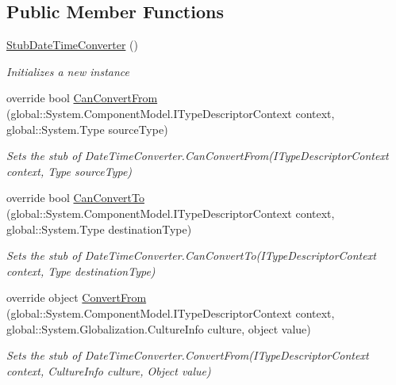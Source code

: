 \subsection*{Public Member Functions}
\begin{DoxyCompactItemize}
\item 
\hyperlink{class_system_1_1_component_model_1_1_fakes_1_1_stub_date_time_converter_abc1ce707daa1f4f85f416f66270790b8}{Stub\-Date\-Time\-Converter} ()
\begin{DoxyCompactList}\small\item\em Initializes a new instance\end{DoxyCompactList}\item 
override bool \hyperlink{class_system_1_1_component_model_1_1_fakes_1_1_stub_date_time_converter_aba91b220821d03876f62b0cb778ff054}{Can\-Convert\-From} (global\-::\-System.\-Component\-Model.\-I\-Type\-Descriptor\-Context context, global\-::\-System.\-Type source\-Type)
\begin{DoxyCompactList}\small\item\em Sets the stub of Date\-Time\-Converter.\-Can\-Convert\-From(\-I\-Type\-Descriptor\-Context context, Type source\-Type)\end{DoxyCompactList}\item 
override bool \hyperlink{class_system_1_1_component_model_1_1_fakes_1_1_stub_date_time_converter_ab91e68cf764e025d6aaf8cf59af7c391}{Can\-Convert\-To} (global\-::\-System.\-Component\-Model.\-I\-Type\-Descriptor\-Context context, global\-::\-System.\-Type destination\-Type)
\begin{DoxyCompactList}\small\item\em Sets the stub of Date\-Time\-Converter.\-Can\-Convert\-To(\-I\-Type\-Descriptor\-Context context, Type destination\-Type)\end{DoxyCompactList}\item 
override object \hyperlink{class_system_1_1_component_model_1_1_fakes_1_1_stub_date_time_converter_a82b34aae4cfe760735595b56bc6e6671}{Convert\-From} (global\-::\-System.\-Component\-Model.\-I\-Type\-Descriptor\-Context context, global\-::\-System.\-Globalization.\-Culture\-Info culture, object value)
\begin{DoxyCompactList}\small\item\em Sets the stub of Date\-Time\-Converter.\-Convert\-From(\-I\-Type\-Descriptor\-Context context, Culture\-Info culture, Object value)\end{DoxyCompactList}\item 

\end{DoxyCompactItemize}
